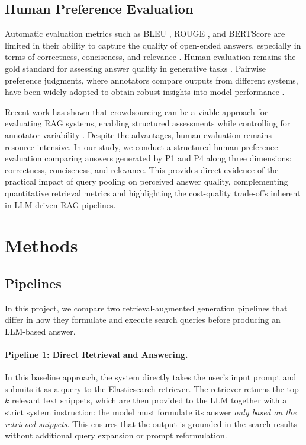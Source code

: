 \documentclass[manuscript,screen]{acmart}
\begin{document}
\begin{CCSXML}
	\subsection{Human Preference Evaluation}
	\label{subsec:human-preference-eval}
	Automatic evaluation metrics such as BLEU \cite{post-2018-call}, ROUGE \cite{lin-2004-rouge}, and BERTScore \cite{zhang2020bertscoreevaluatingtextgeneration} are limited in their ability to capture the quality of open-ended answers, especially in terms of correctness, conciseness, and relevance \cite{karpukhin-etal-2020-dense}. Human evaluation remains the gold standard for assessing answer quality in generative tasks \cite{bai2022traininghelpfulharmlessassistant,thoppilan2022lamdalanguagemodelsdialog}. Pairwise preference judgments, where annotators compare outputs from different systems, have been widely adopted to obtain robust insights into model performance \cite{stiennon2022learningsummarizehumanfeedback}. 
	
	Recent work has shown that crowdsourcing can be a viable approach for evaluating RAG systems, enabling structured assessments while controlling for annotator variability \cite{Gienapp_2025}. Despite the advantages, human evaluation remains resource-intensive. In our study, we conduct a structured human preference evaluation comparing answers generated by P1 and P4 along three dimensions: correctness, conciseness, and relevance. This provides direct evidence of the practical impact of query pooling on perceived answer quality, complementing quantitative retrieval metrics and highlighting the cost-quality trade-offs inherent in LLM-driven RAG pipelines.


\section{Methods}

	\subsection{Pipelines}
	\label{subsec:pipelines}
	
	In this project, we compare two retrieval-augmented generation pipelines that
	differ in how they formulate and execute search queries before producing an
	LLM-based answer.
	
	\paragraph{Pipeline 1: Direct Retrieval and Answering.}
	In this baseline approach, the system directly takes the user’s input prompt
	and submits it as a query to the Elasticsearch retriever. The retriever returns the top-$k$ relevant text
	snippets, which are then provided to the LLM together with a
	strict system instruction: the model must formulate its answer \emph{only based
	on the retrieved snippets}. This ensures that the output is grounded in the
	search results without additional query expansion or prompt reformulation.
	

\end{CCSXML}
\end{document}
